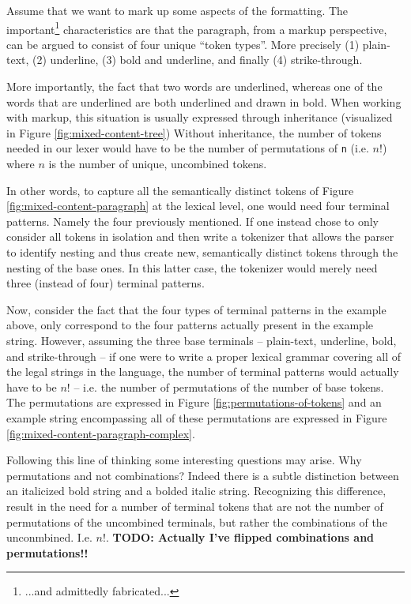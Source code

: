 \documentclass{scrreprt}
\begin{document}
Assume that we want to mark up some aspects of the formatting. The important\footnote{...and admittedly fabricated...} characteristics are that the paragraph, from a markup perspective, can be argued to consist of four unique ``token types''. More precisely (1) plain-text, (2) underline, (3) bold and underline, and finally (4) strike-through.


More importantly, the fact that two words are underlined, whereas one of the words that are underlined are both underlined and drawn in bold. When working with markup, this situation is usually expressed through inheritance (visualized in Figure \ref{fig:mixed-content-tree}) Without inheritance, the number of tokens needed in our lexer would have to be the number of permutations of \texttt{n} (i.e. \(n!\)) where \(n\) is the number of unique, uncombined tokens.

In other words, to capture all the semantically distinct tokens of Figure \ref{fig:mixed-content-paragraph} at the lexical level, one would need four terminal patterns. Namely the four previously mentioned. If one instead chose to only consider all tokens in isolation and then write a tokenizer that allows the parser to identify nesting and thus create new, semantically distinct tokens through the nesting of the base ones. In this latter case, the tokenizer would merely need three (instead of four) terminal patterns.

Now, consider the fact that the four types of terminal patterns in the example above, only correspond to the four patterns actually present in the example string. However, assuming the three base terminals -- plain-text, underline, bold, and strike-through -- if one were to write a proper lexical grammar covering all of the legal strings in the language, the number of terminal patterns would actually have to be \(n!\) -- i.e. the number of permutations of the number of base tokens. The permutations are expressed in Figure \ref{fig:permutations-of-tokens} and an example string encompassing all of these permutations are expressed in Figure \ref{fig:mixed-content-paragraph-complex}.

Following this line of thinking some interesting questions may arise. Why permutations and not combinations? Indeed there is a subtle distinction between an italicized bold string and a bolded italic string. Recognizing this difference, result in the need for a number of terminal tokens that are not the number of permutations of the uncombined terminals, but rather the combinations of the unconmbined. I.e. \(n!\). \textbf{TODO: Actually I've flipped combinations and permutations!!}
\end{document}
